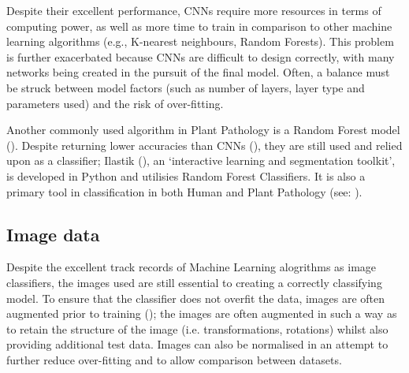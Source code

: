 \documentclass[../../Paper.tex]{subfiles}
\begin{document}
    Despite their excellent performance, CNNs require more resources in
    terms of computing power, as well as more time to train in comparison 
    to other machine learning algorithms (e.g., K-nearest neighbours, Random Forests). This 
    problem is further exacerbated because CNNs are difficult to design correctly, with many networks being created in the pursuit of the final model. Often, a balance must be struck between model factors (such as number of layers, layer type and parameters used) and the risk of over-fitting.

    Another commonly used algorithm in Plant Pathology is a Random Forest model (\cite{baranowski_hyperspectral_2015}). Despite returning lower accuracies than CNNs (\cite{baranowski_hyperspectral_2015}), they are still used and relied upon as a classifier; Ilastik (\cite{sommer_ilastik_2011}), an `interactive learning and segmentation toolkit', is developed in Python and utilisies Random Forest Classifiers. It is also a primary tool in classification in both Human and Plant Pathology (see: \cite{kleesiek_ilastik_2014, haubold_segmenting_2016,visschers_objective_2018}).

\subsection*{Image data}


Despite the excellent track records of Machine Learning alogrithms as image classifiers, the images used are still essential to creating a correctly classifying model. To ensure that the classifier does not overfit the data, images are often augmented prior to training (\cite{simard_best_2003, ciresan_high-performance_2011,ciresan_multi-column_2012,sladojevic_deep_2016}); the images are often augmented in such a way as to retain the structure of the image (i.e. transformations, rotations) whilst also providing additional test data. Images can also be normalised in an attempt to further reduce over-fitting and to allow comparison between datasets.
\end{document}
